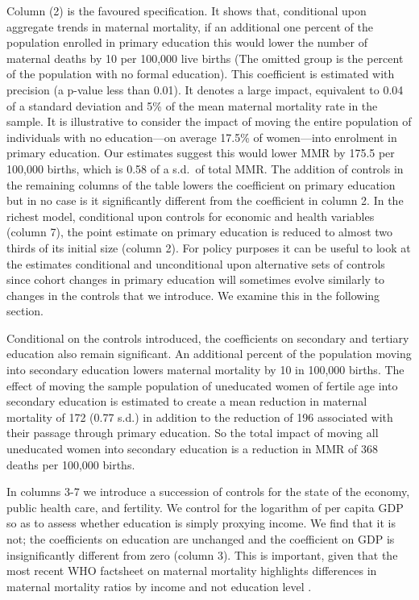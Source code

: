 \documentclass{article}[12pt,subeqn]
\begin{document}
\begin{spacing}{1.4}
Column (2) is the favoured specification. It shows that, conditional upon 
aggregate trends in maternal mortality, if an additional one percent of the 
population enrolled in primary education this would lower the number of maternal 
deaths by 10 per 100,000 live births (The omitted group is the percent of the
population with no formal education). This coefficient is estimated with 
precision (a p-value less than 0.01). It denotes a large impact, equivalent to 
0.04 of a standard deviation and 5\% of the mean maternal mortality rate in the 
sample. It is illustrative to consider the impact of moving the entire population 
of individuals with no education---on average 17.5\% of women---into enrolment in 
primary education. Our estimates suggest this would lower MMR by 175.5 per 100,000 
births, which is 0.58 of a s.d.\ of total MMR. The addition of controls in the 
remaining columns of the table lowers the coefficient on primary education but in 
no case is it significantly different from the coefficient in column 2. In the 
richest model, conditional upon controls for economic and health variables (column 
7), the point estimate on primary education is reduced to almost two thirds of its 
initial size (column 2). For policy purposes it can be useful to look at the 
estimates conditional and unconditional upon alternative sets of controls since 
cohort changes in primary education will sometimes evolve similarly to changes in 
the controls that we introduce. We examine this in the following section.

Conditional on the controls introduced, the coefficients on secondary and tertiary 
education also remain significant. An additional percent of the population moving 
into secondary education lowers maternal mortality by 10 in 100,000 births. The 
effect of moving the sample population of uneducated women of fertile age into 
secondary education is estimated to create a mean reduction in maternal mortality 
of 172 (0.77 s.d.) in addition to the reduction of 196 associated with their passage 
through primary education. So the total impact of moving all uneducated women into 
secondary education is a reduction in MMR of 368 deaths per 100,000 births.

In columns 3-7 we introduce a succession of controls for the state of the
economy, public health care, and fertility. We control for the logarithm of per 
capita GDP so as to assess whether education is simply proxying income. We find 
that it is not; the coefficients on education are unchanged and the coefficient 
on GDP is insignificantly different from zero (column 3). This is important, 
given that the most recent WHO factsheet on maternal mortality highlights 
differences in maternal mortality ratios by income and not education level
\citep{WHO2012}.


\end{spacing}
\end{document}
